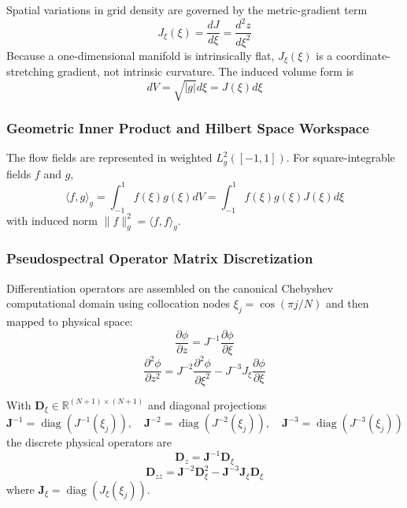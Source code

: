 \documentclass[11pt,a4paper]{article}
\begin{document}
{Spatial variations in grid density are governed by the metric-gradient term
\begin{equation}
    J_{\xi}(\xi) = \frac{dJ}{d\xi} = \frac{d^2z}{d\xi^2}
\end{equation}
Because a one-dimensional manifold is intrinsically flat, $J_{\xi}(\xi)$ is a coordinate-stretching gradient, not intrinsic curvature. The induced volume form is
\begin{equation}
    dV = \sqrt{|g|} d\xi = J(\xi) d\xi
\end{equation}

\subsubsection{Geometric Inner Product and Hilbert Space Workspace}
The flow fields are represented in weighted $L^2_g([-1,1])$. For square-integrable fields $f$ and $g$,
\begin{equation}
    \langle f, g \rangle_g = \int_{-1}^{1} f(\xi) g(\xi) dV = \int_{-1}^{1} f(\xi) g(\xi) J(\xi) d\xi
\end{equation}
with induced norm $\|f\|_g^2 = \langle f, f \rangle_g$.

\subsubsection{Pseudospectral Operator Matrix Discretization}
Differentiation operators are assembled on the canonical Chebyshev computational domain using collocation nodes $\xi_j = \cos(\pi j / N)$ and then mapped to physical space:
\begin{equation}
    \frac{\partial \phi}{\partial z} = J^{-1} \frac{\partial \phi}{\partial \xi}
\end{equation}
\begin{equation}
    \frac{\partial^2 \phi}{\partial z^2} = J^{-2} \frac{\partial^2 \phi}{\partial \xi^2} - J^{-3} J_{\xi} \frac{\partial \phi}{\partial \xi}
\end{equation}

With $\mathbf{D}_{\xi} \in \mathbb{R}^{(N+1)\times(N+1)}$ and diagonal projections
\begin{equation}
    \mathbf{J}^{-1} = \operatorname{diag}\left(J^{-1}(\xi_j)\right), \quad
    \mathbf{J}^{-2} = \operatorname{diag}\left(J^{-2}(\xi_j)\right), \quad
    \mathbf{J}^{-3} = \operatorname{diag}\left(J^{-3}(\xi_j)\right)
\end{equation}
the discrete physical operators are
\begin{equation}
    \mathbf{D}_z = \mathbf{J}^{-1} \mathbf{D}_{\xi}
\end{equation}
\begin{equation}
    \mathbf{D}_{zz} = \mathbf{J}^{-2} \mathbf{D}_{\xi}^2 - \mathbf{J}^{-3} \mathbf{J}_{\xi} \mathbf{D}_{\xi}
\end{equation}
where $\mathbf{J}_{\xi} = \operatorname{diag}\left(J_{\xi}(\xi_j)\right)$.

}
\end{document}

